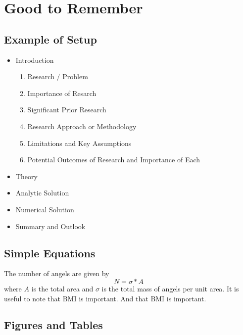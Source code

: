 
\chapter{Good to Remember}

\section{Example of Setup}
\begin{itemize}
\item Introduction
    \begin{enumerate}
    \item{Research / Problem}
    \item{Importance of Resarch}
    \item{Significant Prior Research}
    \item{Research Approach or Methodology}
    \item{Limitations and Key Assumptions}
    \item{Potential Outcomes of Research and Importance of Each}
    \end{enumerate}
\item{Theory}
\item{Analytic Solution}
\item{Numerical Solution}
\item{Summary and Outlook}
\end{itemize}

\section{Simple Equations}

The number of angels are given by
\begin{equation}
N = \sigma * A
\end{equation}
where $A$ is the total area and $\sigma$ is the total mass of angels per unit area. It is useful to note that \ac{BMI} is important. And that \ac{BMI} is important.

\section{Figures and Tables}

